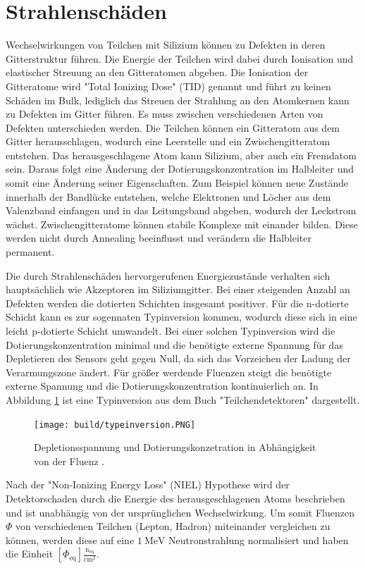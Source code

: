 \section{Strahlenschäden}
Wechselwirkungen von Teilchen mit Silizium können zu Defekten in deren
Gitterstruktur führen.
Die Energie der Teilchen wird dabei durch Ionisation und elastischer Streuung an den Gitteratomen abgeben. Die Ionisation der
Gitteratome wird "Total Ionizing Dose" (TID) genannt und führt zu keinen Schäden im Bulk, lediglich das Streuen der Strahlung an den
Atomkernen kann zu Defekten im Gitter führen.
Es muss zwischen verschiedenen Arten von Defekten unterschieden werden. Die Teilchen können ein Gitteratom aus dem
Gitter herausschlagen, wodurch eine Leerstelle und ein Zwischengitteratom entstehen. Das herausgeschlagene Atom
kann Silizium, aber auch ein Fremdatom sein. Daraus folgt eine Änderung der Dotierungskonzentration im
Halbleiter und somit eine Änderung seiner Eigenschaften. Zum Beispiel können neue Zustände innerhalb der
Bandlücke entstehen, welche Elektronen und Löcher aus dem Valenzband einfangen  und in das Leitungsband
abgeben, wodurch der Leckstrom wächst.
Zwischengitteratome können stabile Komplexe mit einander bilden. Diese werden nicht durch Annealing
beeinflusst und verändern die Halbleiter permanent.

Die durch Strahlenschäden hervorgerufenen Energiezustände verhalten sich hauptsächlich wie Akzeptoren im Siliziumgitter. Bei
einer steigenden Anzahl an Defekten werden die dotierten Schichten insgesamt positiver. Für die n-dotierte Schicht kann
es zur sogennaten Typinversion kommen, wodurch diese sich in eine leicht p-dotierte Schicht umwandelt. Bei einer
solchen Typinversion wird die Dotierungskonzentration minimal und die benötigte externe Spannung für das Depletieren des Sensors geht gegen Null, da sich
das Vorzeichen der Ladung der Verarmungszone ändert.
Für größer werdende Fluenzen steigt die benötigte externe Spannung und die
Dotierungskonzentration kontinuierlich an.
In Abbildung \ref{fig:typeinversion} ist eine Typinversion aus dem Buch "Teilchendetektoren" dargestellt.

\begin{figure}
    \texttt{[image: build/typeinversion.PNG]}
\caption{Depletionsspannung und Dotierungskonzetration in Abhängigkeit von der Fluenz \cite{typinversion}.}
\label{fig:typeinversion}
\end{figure}

Nach der "Non-Ionizing Energy Loss" (NIEL) Hypothese wird der Detektorschaden durch die Energie des herausgeschlagenen
Atoms beschrieben und ist unabhängig von der ursprünglichen Wechselwirkung.
Um somit Fluenzen $ \Phi$ von verschiedenen Teilchen (Lepton, Hadron) miteinander vergleichen zu können, werden diese
auf eine $\SI{1}{\mega\eV}$ Neutronstrahlung normalisiert und haben die Einheit $[\Phi_{\mathrm{eq}}]\mathrm{\frac{n_{\mathrm{eq}}}{cm^2}}$.



